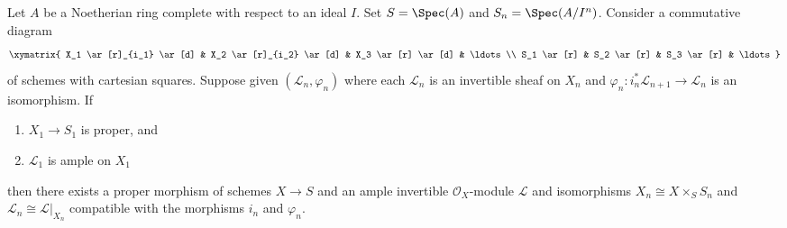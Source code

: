 %
\begin{theorem}
\label{theorem-algebraization}
Let $A$ be a Noetherian ring complete with respect to an ideal $I$.
Set $S = \Spec(A)$ and $S_n = \Spec(A/I^n)$. Consider a commutative
diagram
$$
\xymatrix{
X_1 \ar[r]_{i_1} \ar[d] & X_2 \ar[r]_{i_2} \ar[d] & X_3 \ar[r] \ar[d] &
\ldots \\
S_1 \ar[r] & S_2 \ar[r] & S_3 \ar[r] & \ldots
}
$$
of schemes with cartesian squares. Suppose given $(\mathcal{L}_n, \varphi_n)$
where each $\mathcal{L}_n$ is an invertible sheaf on $X_n$ and
$\varphi_n : i_n^*\mathcal{L}_{n + 1} \to \mathcal{L}_n$
is an isomorphism. If
\begin{enumerate}
\item $X_1 \to S_1$ is proper, and
\item $\mathcal{L}_1$ is ample on $X_1$
\end{enumerate}
then there exists a proper morphism of schemes $X \to S$
and an ample invertible $\mathcal{O}_X$-module $\mathcal{L}$
and isomorphisms $X_n \cong X \times_S S_n$ and
$\mathcal{L}_n \cong \mathcal{L}|_{X_n}$ compatible with
the morphisms $i_n$ and $\varphi_n$.
\end{theorem}

